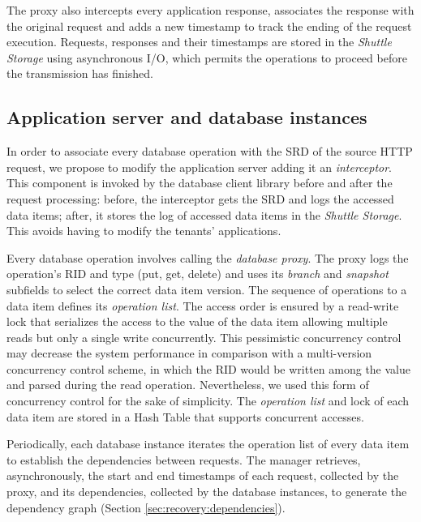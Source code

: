 The proxy also intercepts every application response, associates the response with the original request and adds a new timestamp to track the ending of the request execution. Requests, responses and their timestamps are stored in the \emph{Shuttle Storage} using asynchronous I/O, which permits the operations to proceed before the transmission has finished. 


\subsection{Application server and database instances}
\label{sec:architecture:database}

In order to associate every database operation with the \ac{SRD} of the source HTTP request, we propose to modify the application server adding it an \emph{interceptor}. This component is invoked by the database client library before and after the request processing: before, the interceptor gets the \ac{SRD} and logs the accessed data items; after, it stores the log of accessed data items in the \emph{Shuttle Storage}. This avoids having to modify the tenants' applications.

Every database operation involves calling the \emph{database proxy}. The proxy logs the operation's \ac{RID} and type (put, get, delete) and uses its \emph{branch} and \emph{snapshot} subfields to select the correct data item version. The sequence of operations to a data item defines its \emph{operation list}.  
The access order is ensured by a read-write lock that serializes the access to the value of the data item allowing multiple reads but only a single write concurrently. This pessimistic concurrency control may decrease the system performance in comparison with a multi-version concurrency control scheme, in which the \ac{RID} would be written among the value and parsed during the read operation. Nevertheless, we used this form of concurrency control for the sake of simplicity.
%
The \emph{operation list} and lock of each data item are stored in a Hash Table that supports concurrent accesses.

Periodically, each database instance iterates the operation list of every data item to establish the dependencies between requests. The manager retrieves, asynchronously, the start and end timestamps of each request, collected by the proxy, and its dependencies, collected by the database instances, to generate the dependency graph (Section \ref{sec:recovery:dependencies}).

